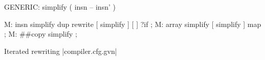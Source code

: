 \centering

  \begin{factorcode}
    GENERIC: simplify ( insn -- insn' )

    M: insn simplify dup rewrite [ simplify ] [ ] ?if ;
    M: array simplify [ simplify ] map ;
    M: ##copy simplify ;
  \end{factorcode}

\caption{Iterated rewriting \factor|compiler.cfg.gvn|}
